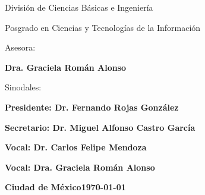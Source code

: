 \vspace{2cm}

\centerline{\large  División de Ciencias Básicas e Ingeniería}
\vspace{0.2cm}
\centerline{\large Posgrado en Ciencias y Tecnologías de la Información}

\vspace{2cm}
\centerline{\normalsize Asesora:}
\vspace{0.1cm}
\centerline{\bf Dra. Graciela Román Alonso}
\vspace{0.5cm}

\vspace{1.0cm}
\centerline{\normalsize Sinodales:}
\vspace{0.1cm}
\centerline{\bf Presidente: Dr. Fernando Rojas González}
\vspace{0.1cm}
\centerline{\bf Secretario: Dr. Miguel Alfonso Castro García}
\vspace{0.1cm}
\centerline{\bf Vocal:  Dr. Carlos Felipe Mendoza}
\vspace{0.1cm}
\centerline{\bf Vocal: Dra. Graciela Román Alonso}
\vspace{0.1cm}

\vfill
\begingroup
\setlength{\parindent}{0cm}
{
\large\bf Ciudad de México\hfill \mydate\today
}
\endgroup

\restoregeometry